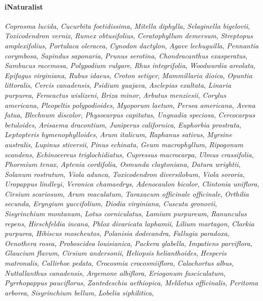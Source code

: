 \documentclass[final]{cvpr}
\begin{document}
\vspace{-0.4cm}
\paragraph{iNaturalist} \textit{Coprosma lucida}, \textit{Cucurbita foetidissima}, \textit{Mitella diphylla}, \textit{Selaginella bigelovii}, \textit{Toxicodendron vernix}, \textit{Rumex obtusifolius}, \textit{Ceratophyllum demersum}, \textit{Streptopus amplexifolius}, \textit{Portulaca oleracea}, \textit{Cynodon dactylon}, \textit{Agave lechuguilla}, \textit{Pennantia corymbosa}, \textit{Sapindus saponaria}, \textit{Prunus serotina}, \textit{Chondracanthus exasperatus}, \textit{Sambucus racemosa}, \textit{Polypodium vulgare}, \textit{Rhus integrifolia}, \textit{Woodwardia areolata}, \textit{Epifagus virginiana}, \textit{Rubus idaeus}, \textit{Croton setiger}, \textit{Mammillaria dioica}, \textit{Opuntia littoralis}, \textit{Cercis canadensis}, \textit{Psidium guajava}, \textit{Asclepias exaltata}, \textit{Linaria purpurea}, \textit{Ferocactus wislizeni}, \textit{Briza minor}, \textit{Arbutus menziesii}, \textit{Corylus americana}, \textit{Pleopeltis polypodioides}, \textit{Myoporum laetum}, \textit{Persea americana}, \textit{Avena fatua}, \textit{Blechnum discolor}, \textit{Physocarpus capitatus}, \textit{Ungnadia speciosa}, \textit{Cercocarpus betuloides}, \textit{Arisaema dracontium}, \textit{Juniperus californica}, \textit{Euphorbia prostrata}, \textit{Leptopteris hymenophylloides}, \textit{Arum italicum}, \textit{Raphanus sativus}, \textit{Myrsine australis}, \textit{Lupinus stiversii}, \textit{Pinus echinata}, \textit{Geum macrophyllum}, \textit{Ripogonum scandens}, \textit{Echinocereus triglochidiatus}, \textit{Cupressus macrocarpa}, \textit{Ulmus crassifolia}, \textit{Phormium tenax}, \textit{Aptenia cordifolia}, \textit{Osmunda claytoniana}, \textit{Datura wrightii}, \textit{Solanum rostratum}, \textit{Viola adunca}, \textit{Toxicodendron diversilobum}, \textit{Viola sororia}, \textit{Uropappus lindleyi}, \textit{Veronica chamaedrys}, \textit{Adenocaulon bicolor}, \textit{Clintonia uniflora}, \textit{Cirsium scariosum}, \textit{Arum maculatum}, \textit{Taraxacum officinale officinale}, \textit{Orthilia secunda}, \textit{Eryngium yuccifolium}, \textit{Diodia virginiana}, \textit{Cuscuta gronovii}, \textit{Sisyrinchium montanum}, \textit{Lotus corniculatus}, \textit{Lamium purpureum}, \textit{Ranunculus repens}, \textit{Hirschfeldia incana}, \textit{Phlox divaricata laphamii}, \textit{Lilium martagon}, \textit{Clarkia purpurea}, \textit{Hibiscus moscheutos}, \textit{Polanisia dodecandra}, \textit{Fallugia paradoxa}, \textit{Oenothera rosea}, \textit{Proboscidea louisianica}, \textit{Packera glabella}, \textit{Impatiens parviflora}, \textit{Glaucium flavum}, \textit{Cirsium andersonii}, \textit{Heliopsis helianthoides}, \textit{Hesperis matronalis}, \textit{Callirhoe pedata}, \textit{Crocosmia  crocosmiiflora}, \textit{Calochortus albus}, \textit{Nuttallanthus canadensis}, \textit{Argemone albiflora}, \textit{Eriogonum fasciculatum}, \textit{Pyrrhopappus pauciflorus}, \textit{Zantedeschia aethiopica}, \textit{Melilotus officinalis}, \textit{Peritoma arborea}, \textit{Sisyrinchium bellum}, \textit{Lobelia siphilitica}, 
\end{document}
